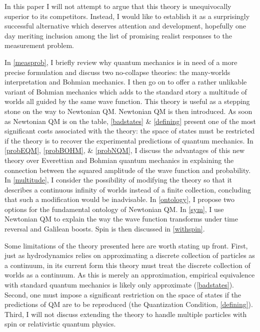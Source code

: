 \documentclass[onecolumn,secnumarabic,balancelastpage,amsmath,amssymb,nofootinbib]{article}
\begin{document}
In this paper I will not attempt to argue that this theory is unequivocally superior to its competitors.  Instead, I would like to establish it as a surprisingly successful alternative which deserves attention and development, hopefully one day meriting inclusion among the list of promising realist responses to the measurement problem.

In \textsection \ref{measprob}, I briefly review why quantum mechanics is in need of a more precise formulation and discuss two no-collapse theories: the many-worlds interpretation and Bohmian mechanics.  I then go on to offer a rather unlikable variant of Bohmian mechanics which adds to the standard story a multitude of worlds all guided by the same wave function.  This theory is useful as a stepping stone on the way to Newtonian QM.  Newtonian QM is then introduced.  As soon as Newtonian QM is on the table, \textsection \ref{badstates} \& \ref{defining} present one of the most significant costs associated with the theory: the space of states must be restricted if the theory is to recover the experimental predictions of quantum mechanics.  In \textsection \ref{probEQM}, \ref{probBOHM}, \& \ref{probNQM}, I discuss the advantages of this new theory over Everettian and Bohmian quantum mechanics in explaining the connection between the squared amplitude of the wave function and probability.  In \textsection \ref{multitude}, I consider the possibility of modifying the theory so that it describes a continuous infinity of worlds instead of a finite collection, concluding that such a modification would be inadvisable.  In \textsection \ref{ontology}, I propose two options for the fundamental ontology of Newtonian QM.  In \textsection \ref{sym}, I use Newtonian QM to explain the way the wave function transforms under time reversal and Galilean boosts.  Spin is then discussed in \textsection \ref{withspin}.

Some limitations of the theory presented here are worth stating up front.  First, just as hydrodynamics relies on approximating a discrete collection of particles as a continuum, in its current form this theory must treat the discrete collection of worlds as a continuum.  As this is merely an approximation, empirical equivalence with standard quantum mechanics is likely only approximate (\textsection \ref{badstates}).  Second, one must impose a significant restriction on the space of states if the predictions of QM are to be reproduced (the Quantization Condition, \textsection \ref{defining}).  Third, I will not discuss extending the theory to handle multiple particles with spin or relativistic quantum physics.
\end{document}

